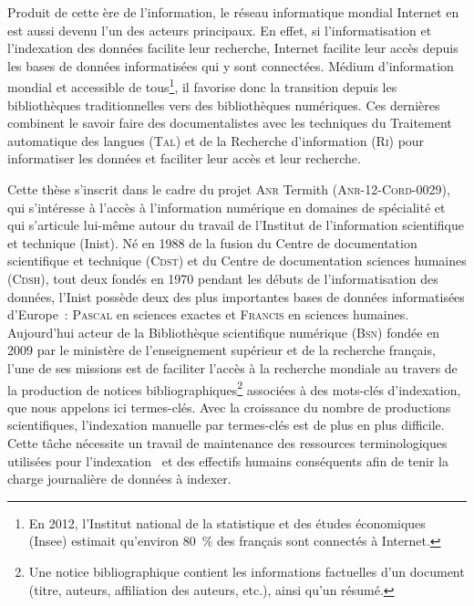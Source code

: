     Produit de cette ère de l'information, le réseau informatique mondial
    Internet en est aussi devenu l'un des acteurs principaux. En effet, si
    l'informatisation et l'indexation des données facilite leur recherche,
    Internet facilite leur accès depuis les bases de données informatisées qui y
    sont connectées. Médium d'information mondial et accessible de
    tous\footnote{En 2012, l'Institut national de la statistique et des études
    économiques (Insee) estimait qu'environ 80~\% des français sont connectés à
    Internet.}, il favorise donc la transition depuis les bibliothèques
    traditionnelles vers des bibliothèques numériques. Ces dernières combinent
    le savoir faire des documentalistes avec les techniques du Traitement
    automatique des langues (\textsc{Tal}) et de la Recherche d'information
    (\textsc{Ri}) pour informatiser les données et faciliter leur accès et leur
    recherche.

    Cette thèse s'inscrit dans le cadre du projet \textsc{Anr} Termith
    (\textsc{Anr-12-Cord-0029}), qui s'intéresse à l'accès à l'information
    numérique en domaines de spécialité et qui s'articule lui-même autour du
    travail de l'Institut de l'information scientifique et technique (Inist). Né
    en 1988 de la fusion du Centre de documentation scientifique et technique
    (\textsc{Cdst}) et du Centre de documentation sciences humaines
    (\textsc{Cdsh}), tout deux fondés en 1970 pendant les débuts de
    l'informatisation des données, l'Inist possède deux des plus importantes
    bases de données informatisées d'Europe~: \textsc{Pascal} en sciences
    exactes et \textsc{Francis} en sciences humaines. Aujourd'hui acteur de la
    Bibliothèque scientifique numérique (\textsc{Bsn}) fondée en 2009 par le
    ministère de l'enseignement supérieur et de la recherche français, l'une de
    ses missions est de faciliter l'accès à la recherche mondiale au travers de
    la production de notices bibliographiques\footnote{Une notice
    bibliographique contient les informations factuelles d'un document (titre,
    auteurs, affiliation des auteurs, etc.), ainsi qu'un résumé.} associées à
    des mots-clés d'indexation, que nous appelons ici termes-clés. Avec la
    croissance du nombre de productions scientifiques, l'indexation manuelle par
    termes-clés est de plus en plus difficile. Cette tâche nécessite un travail
    de maintenance des ressources terminologiques utilisées pour
    l'indexation~\cite{guinchat1996techniquesdocumentaires} et
    des effectifs humains conséquents afin de tenir la charge journalière de
    données à indexer.

